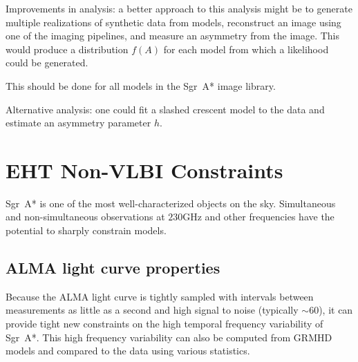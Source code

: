 \documentclass[twocolumn,tighten,dvipsnames]{aastex63}
\newcommand\sgra{Sgr~A*\xspace}
\newcommand\Rh{R_\mathrm{high}}
\newcommand\<{{\langle}}
\renewcommand\>{{\rangle}} %
\begin{document}
\begin{figure*}
  \caption{Asymmetry statistic $A$ for models in the \sgra image library.  Lower $A$ is more symmetric.  All models are more symmetric when viewed nearly face on (or anti-face-on).  The $\Rh = 1$ models exhibit distinct trends and the models will likely be eliminated by other considerations.  For $\Rh \ge 10$ SANE edge-on models are most asymmetric at high positive spin, while the MAD edge-on models are most asymmetric at moderate negative spin.}
  \label{fig:asymm}
\end{figure*}

Improvements in analysis: a better approach to this analysis might be to generate multiple realizations of synthetic data from models, reconstruct an image using one of the imaging pipelines, and measure an asymmetry from the image.  This would produce a distribution $f(A)$ for each model from which a likelihood could be generated.

This should be done for all models in the \sgra image library.

Alternative analysis: one could fit a slashed crescent model to the data and estimate an asymmetry parameter $h$.

\section{EHT Non-VLBI Constraints}
\label{sec:EHT_nonVLBI}

\sgra is one of the most well-characterized objects on the sky. Simultaneous and non-simultaneous observations at $230$GHz and  other frequencies have the potential to sharply constrain models.

\subsection{ALMA light curve properties}
\label{sec:lcconst}

Because the ALMA light curve is tightly sampled with intervals  between measurements as little as a second and high signal to noise (typically $\sim 60$), it can provide tight new constraints on the high temporal frequency variability of \sgra.  This high frequency variability can also be computed from GRMHD models and compared to the data using various statistics.
\end{document}
